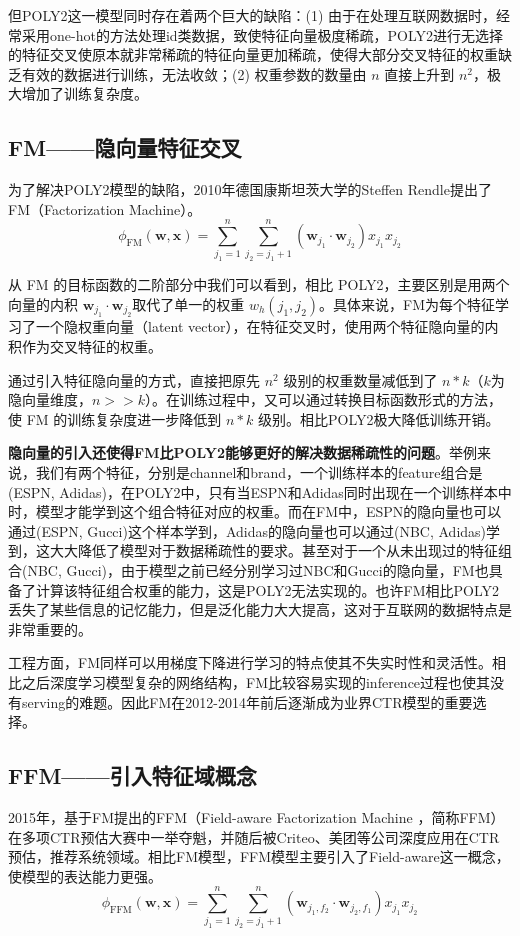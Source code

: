 \documentclass[12pt]{article}
\begin{document}
但POLY2这一模型同时存在着两个巨大的缺陷：(1) 由于在处理互联网数据时，经常采用one-hot的方法处理id类数据，致使特征向量极度稀疏，POLY2进行无选择的特征交叉使原本就非常稀疏的特征向量更加稀疏，使得大部分交叉特征的权重缺乏有效的数据进行训练，无法收敛；(2) 权重参数的数量由 $n$ 直接上升到 $n^2$，极大增加了训练复杂度。

\subsection{FM——隐向量特征交叉}
为了解决POLY2模型的缺陷，2010年德国康斯坦茨大学的Steffen Rendle提出了FM（Factorization Machine）。
$$
\phi_{\text{FM}}(\mathbf{w}, \mathbf{x}) = \sum_{j_1=1}^n\sum_{j_2 = j_1 + 1}^n (\mathbf{w}_{j_1} \cdot \mathbf{w}_{j_2})x_{j_1}x_{j_2}
$$

从 FM 的目标函数的二阶部分中我们可以看到，相比 POLY2，主要区别是用两个向量的内积 $\mathbf{w}_{j_1} \cdot \mathbf{w}_{j_2}$取代了单一的权重 $w_h(j_1, j_2)$。具体来说，FM为每个特征学习了一个隐权重向量（latent vector），在特征交叉时，使用两个特征隐向量的内积作为交叉特征的权重。

通过引入特征隐向量的方式，直接把原先 $n^2$ 级别的权重数量减低到了 $n*k$（$k$为隐向量维度，$n >> k$）。在训练过程中，又可以通过转换目标函数形式的方法，使 FM 的训练复杂度进一步降低到 $n*k$ 级别。相比POLY2极大降低训练开销。

\textbf{隐向量的引入还使得FM比POLY2能够更好的解决数据稀疏性的问题}。举例来说，我们有两个特征，分别是channel和brand，一个训练样本的feature组合是(ESPN, Adidas)，在POLY2中，只有当ESPN和Adidas同时出现在一个训练样本中时，模型才能学到这个组合特征对应的权重。而在FM中，ESPN的隐向量也可以通过(ESPN, Gucci)这个样本学到，Adidas的隐向量也可以通过(NBC, Adidas)学到，这大大降低了模型对于数据稀疏性的要求。甚至对于一个从未出现过的特征组合(NBC, Gucci)，由于模型之前已经分别学习过NBC和Gucci的隐向量，FM也具备了计算该特征组合权重的能力，这是POLY2无法实现的。也许FM相比POLY2丢失了某些信息的记忆能力，但是泛化能力大大提高，这对于互联网的数据特点是非常重要的。

工程方面，FM同样可以用梯度下降进行学习的特点使其不失实时性和灵活性。相比之后深度学习模型复杂的网络结构，FM比较容易实现的inference过程也使其没有serving的难题。因此FM在2012-2014年前后逐渐成为业界CTR模型的重要选择。

\subsection{FFM——引入特征域概念}
2015年，基于FM提出的FFM（Field-aware Factorization Machine ，简称FFM）在多项CTR预估大赛中一举夺魁，并随后被Criteo、美团等公司深度应用在CTR预估，推荐系统领域。相比FM模型，FFM模型主要引入了Field-aware这一概念，使模型的表达能力更强。
$$
\phi_{\text{FFM}}(\mathbf{w}, \mathbf{x}) = \sum_{j_1=1}^n\sum_{j_2 = j_1 + 1}^n (\mathbf{w}_{j_1, f_2} \cdot \mathbf{w}_{j_2, f_1})x_{j_1}x_{j_2}
$$
\end{document}
